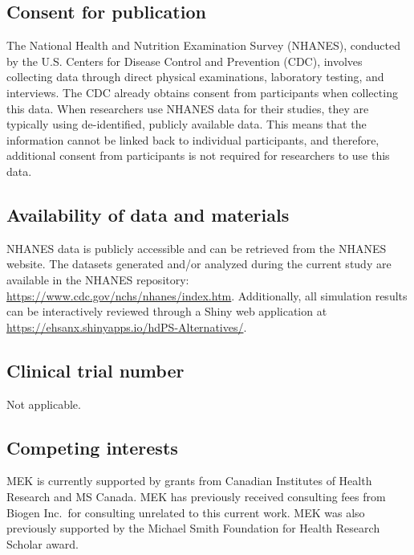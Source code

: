 \documentclass[sn-vancouver,Numbered,lineno,pdflatex]{sn-jnl}
\begin{document}
\subsection*{Consent for publication}\label{consent-for-publication}

The National Health and Nutrition Examination Survey (NHANES), conducted
by the U.S. Centers for Disease Control and Prevention (CDC), involves
collecting data through direct physical examinations, laboratory
testing, and interviews. The CDC already obtains consent from
participants when collecting this data. When researchers use NHANES data
for their studies, they are typically using de-identified, publicly
available data. This means that the information cannot be linked back to
individual participants, and therefore, additional consent from
participants is not required for researchers to use this data.

\subsection*{Availability of data and
materials}\label{availability-of-data-and-materials}

NHANES data is publicly accessible and can be retrieved from the NHANES
website. The datasets generated and/or analyzed during the current study
are available in the NHANES repository:
\url{https://www.cdc.gov/nchs/nhanes/index.htm}. Additionally, all
simulation results can be interactively reviewed through a Shiny web
application at \url{https://ehsanx.shinyapps.io/hdPS-Alternatives/}.


\subsection*{Clinical trial number}\label{Clinical trial number}

Not applicable.

\subsection*{Competing interests}\label{competing-interests}

MEK is currently supported by grants from Canadian Institutes of Health
Research and MS Canada. MEK has previously received consulting fees from
Biogen Inc.~for consulting unrelated to this current work. MEK was also
previously supported by the Michael Smith Foundation for Health Research
Scholar award.
\end{document}
